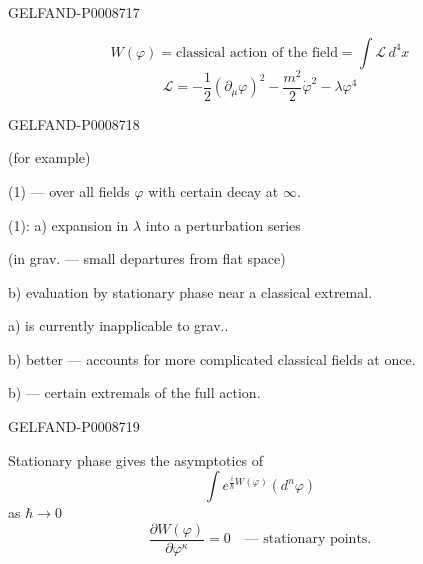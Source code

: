 \begin{GelfandAdjacentEvidence}{GELFAND-P000871}{7}


\begin{equation*}
W(\varphi)=\text{classical action of the field}=\int\mathcal L\,d^4x
\tag{3}
\end{equation*}
\begin{equation*}
\mathcal L=-\frac12(\partial_\mu\varphi)^2-\frac{m^2}{2}\dot\varphi^2-\lambda\varphi^4
\tag{4}
\end{equation*}
\end{GelfandAdjacentEvidence}
\begin{GelfandAdjacentEvidence}{GELFAND-P000871}{8}


(for example)

(1) --- over all fields $\varphi$ with certain decay at $\infty$.

 (1): a) expansion in $\lambda$ into a perturbation series

(in grav. --- small departures from flat space)

b) evaluation by stationary phase near a classical extremal.

a) is currently inapplicable to grav..

b) better --- accounts for more complicated classical fields at once.

b) --- certain extremals of the full action.
\end{GelfandAdjacentEvidence}
\begin{GelfandAdjacentEvidence}{GELFAND-P000871}{9}


Stationary phase gives the asymptotics of
\begin{equation*}
\int e^{\frac{i}{\hbar}W(\varphi)}(d^n\varphi)
\tag{5}
\end{equation*}
as $\hbar\to0$
\begin{equation*}
\frac{\partial W(\varphi)}{\partial\varphi^\kappa}=0
\quad\text{--- stationary points.}
\tag{6}
\end{equation*}
\end{GelfandAdjacentEvidence}


